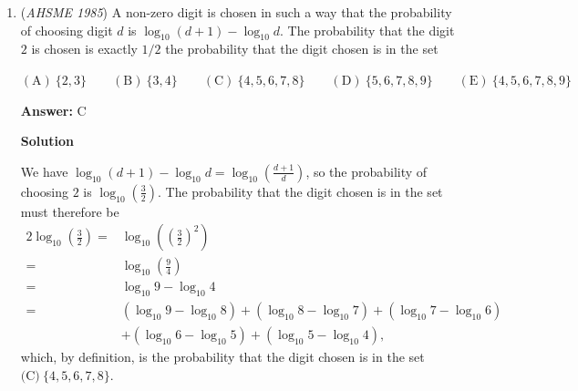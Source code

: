 \begin{enumerate}
 Again from above, $z_1 = 2$ and $z_2 = -1$, so 
 \begin{align*}1 &= -z_2 \\ &= z_3+z_1 \\ &= x^7+y^7+2,\end{align*}
 giving $z_3 = x^7+y^7 = -1$. Similarly, 
 \begin{align*}1 &= -z_3 \\ &= z_4+z_2 \\ &= x^9+y^9-1,\end{align*}
 giving $z_4 = x^9+y^9 = 2 \neq -1$, meaning that the answer must be $\text{(C)}$. To confirm this, we further note that 
 \begin{align*}-2 &= -z_4 \\ &= z_5+z_3 \\ &= x^{11}+y^{11}-1,\end{align*}
 giving $z_5 = x^{11}+y^{11} = -1$, and finally 
 \begin{align*}1 &= -z_5 \\ &= z_6+z_4 \\ &= x^{13}+y^{13}+2,\end{align*}
 giving $x^{13}+y^{13} = -1$, which shows that the only false statement is indeed $\boxed{\text{(C)} \ x^9+y^9 = -1}$.

 


	\item (\textit{AHSME 1985}) A non-zero digit is chosen in such a way that the probability of choosing digit $d$ is $\log_{10}{(d+1)}-\log_{10}{d}$. The probability that the digit $2$ is chosen is exactly $1/2$ the probability that the digit chosen is in the set


 $\mathrm{(A)\ } \{2,3\} \qquad \mathrm{(B) \ }\{3,4\} \qquad \mathrm{(C) \  } \{4,5,6,7,8\} \qquad \mathrm{(D) \  } \{5,6,7,8,9\} \qquad \mathrm{(E) \  }\{4,5,6,7,8,9\}$

 \textbf{Answer: }C



\textbf{Solution}

We have $\log_{10}{(d+1)}-\log_{10}{d} = \log_{10}{\left(\frac{d+1}{d}\right)}$, so the probability of choosing $2$ is $\log_{10}{\left(\frac{3}{2}\right)}$. The probability that the digit chosen is in the set must therefore be 
 \begin{align*}2\log_{10}{\left(\frac{3}{2}\right)} = &\log_{10}{\left(\left(\frac{3}{2}\right)^2\right)} \\ = &\log_{10}{\left(\frac{9}{4}\right)} \\ = &\log_{10}{9}-\log_{10}{4} \\ = &\left(\log_{10}{9}-\log_{10}{8}\right)+\left(\log_{10}{8}-\log_{10}{7}\right)+\left(\log_{10}{7}-\log_{10}{6}\right) \\ &+\left(\log_{10}{6}-\log_{10}{5}\right)+\left(\log_{10}{5}-\log_{10}{4}\right),\end{align*}
which, by definition, is the probability that the digit chosen is in the set $\boxed{\text{(C)} \ \{4,5,6,7,8\}}$.


\end{enumerate}
